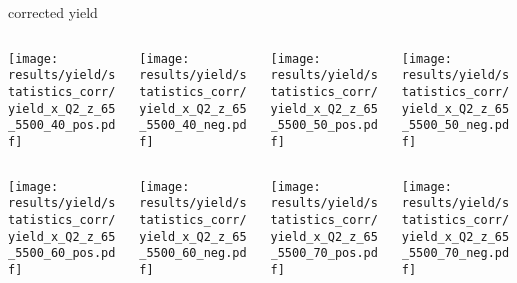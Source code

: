\begin{frame}{corrected yield}
\begin{columns}
\begin{column}[T]{0.25\textwidth}
\texttt{[image: results/yield/statistics\_corr/yield\_x\_Q2\_z\_65\_5500\_40\_pos.pdf]}
\end{column}
\begin{column}[T]{0.25\textwidth}
\texttt{[image: results/yield/statistics\_corr/yield\_x\_Q2\_z\_65\_5500\_40\_neg.pdf]}
\end{column}
\begin{column}[T]{0.25\textwidth}
\texttt{[image: results/yield/statistics\_corr/yield\_x\_Q2\_z\_65\_5500\_50\_pos.pdf]}
\end{column}
\begin{column}[T]{0.25\textwidth}
\texttt{[image: results/yield/statistics\_corr/yield\_x\_Q2\_z\_65\_5500\_50\_neg.pdf]}
\end{column}
\end{columns}
\begin{columns}
\begin{column}[T]{0.25\textwidth}
\texttt{[image: results/yield/statistics\_corr/yield\_x\_Q2\_z\_65\_5500\_60\_pos.pdf]}
\end{column}
\begin{column}[T]{0.25\textwidth}
\texttt{[image: results/yield/statistics\_corr/yield\_x\_Q2\_z\_65\_5500\_60\_neg.pdf]}
\end{column}
\begin{column}[T]{0.25\textwidth}
\texttt{[image: results/yield/statistics\_corr/yield\_x\_Q2\_z\_65\_5500\_70\_pos.pdf]}
\end{column}
\begin{column}[T]{0.25\textwidth}
\texttt{[image: results/yield/statistics\_corr/yield\_x\_Q2\_z\_65\_5500\_70\_neg.pdf]}
\end{column}
\end{columns}
\end{frame}
